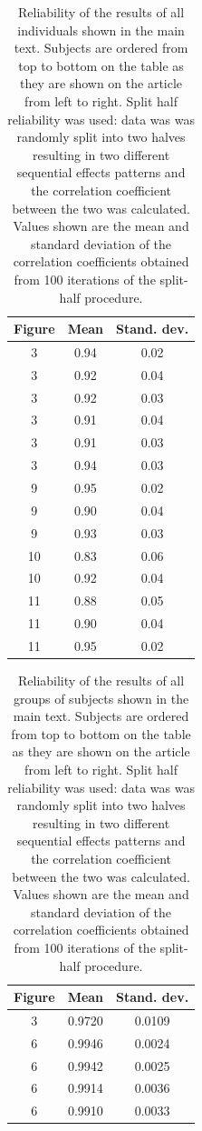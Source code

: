 \documentclass[12pt,letterpaper]{article}
\begin{document}
\begin{table}[t]
\centering
\begin{tabular}{ccc}
Figure &Mean & Stand. dev.\\ \hline
3 & 0.94 & 0.02 \\ 
3 & 0.92 & 0.04 \\ 
3 & 0.92 & 0.03 \\ 
3 & 0.91 & 0.04 \\ 
3 & 0.91 & 0.03 \\ 
3 & 0.94 & 0.03 \\ \hline
9 & 0.95 & 0.02 \\ 
9 & 0.90 & 0.04 \\ 
9 & 0.93 & 0.03 \\ \hline
10 & 0.83 & 0.06 \\ 
10 & 0.92 & 0.04 \\ \hline
11 & 0.88 & 0.05 \\ 
11 & 0.90 & 0.04 \\ 
11 & 0.95 & 0.02 \\ \hline
\end{tabular}
\caption[]{Reliability of the results of all individuals shown in the main text. Subjects are ordered from top to bottom on the table as they are shown on the article from left to right. Split half reliability was used: data was was randomly split into two halves resulting in two different sequential effects patterns and the correlation coefficient between the two was calculated. Values shown are the mean and standard deviation of the correlation coefficients obtained from 100 iterations of the split-half procedure.}
\end{table}

\clearpage

\begin{table}[t]
\centering
\begin{tabular}{ccc}
Figure & Mean & Stand. dev.\\ \hline
3 & 0.9720 & 0.0109 \\ \hline
6 & 0.9946 & 0.0024 \\ 
6 & 0.9942 & 0.0025 \\ 
6 & 0.9914 & 0.0036 \\ 
6 & 0.9910 & 0.0033 \\ 
\end{tabular}
\caption[]{Reliability of the results of all groups of subjects shown in the main text. Subjects are ordered from top to bottom on the table as they are shown on the article from left to right. Split half reliability was used: data was was randomly split into two halves resulting in two different sequential effects patterns and the correlation coefficient between the two was calculated. Values shown are the mean and standard deviation of the correlation coefficients obtained from 100 iterations of the split-half procedure.}
\end{table}
\end{document}
